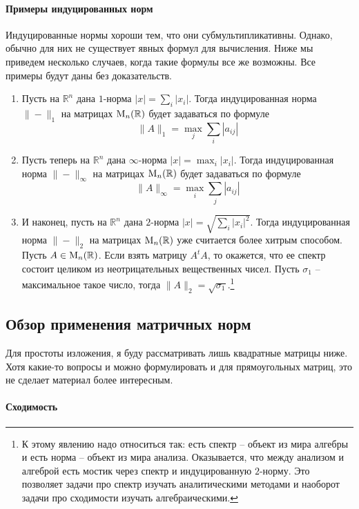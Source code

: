 \paragraph{Примеры индуцированных норм}

Индуцированные нормы хороши тем, что они субмультипликативны. Однако, обычно для них не существует явных формул для вычисления. Ниже мы приведем несколько случаев, когда такие формулы все же возможны. Все примеры будут даны без доказательств.
\begin{enumerate}
\item Пусть на $\mathbb R^n$ дана $1$-норма $|x| = \sum_i |x_i|$. Тогда индуцированная норма $\|{-}\|_1$ на матрицах $\operatorname{M}_{n}(\mathbb R)$ будет задаваться по формуле 
\[
\|A\|_1 = \max_j\sum_i|a_{ij}|
\]

\item Пусть теперь на $\mathbb R^n$ дана $\infty$-норма $|x| = \max_i |x_i|$. Тогда индуцированная норма $\|{-}\|_\infty$ на матрицах $\operatorname{M}_{n}(\mathbb R)$ будет задаваться по формуле
\[
\|A\|_\infty = \max_i\sum_j|a_{ij}|
\]

\item И наконец, пусть на $\mathbb R^n$ дана $2$-норма $|x| = \sqrt{\sum_i |x_i|^2}$. Тогда индуцированная норма $\|{-}\|_2$ на матрицах $\operatorname{M}_{n}(\mathbb R)$ уже считается более хитрым способом. Пусть $A\in\operatorname{M}_{n}(\mathbb R)$. Если взять матрицу $A^tA$, то окажется, что ее спектр состоит целиком из неотрицательных вещественных чисел. Пусть $\sigma_1$ -- максимальное такое число, тогда $\|A\|_2 = \sqrt{\sigma_1}$.\footnote{К этому явлению надо относиться так: есть спектр -- объект из мира алгебры и есть норма -- объект из мира анализа. Оказывается, что между анализом и алгеброй есть мостик через спектр и индуцированную $2$-норму. Это позволяет задачи про спектр изучать аналитическими методами и наоборот задачи про сходимости изучать алгебраическими.}
\end{enumerate} 

\subsection{Обзор применения матричных норм}

Для простоты изложения, я буду рассматривать лишь квадратные матрицы ниже. Хотя какие-то вопросы и можно формулировать и для прямоугольных матриц, это не сделает материал более интересным.

\paragraph{Сходимость}

